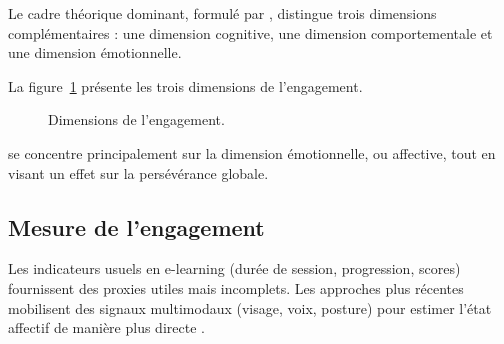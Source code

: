Le cadre théorique dominant, formulé par
\textcite{fredricks2004school}, distingue trois dimensions complémentaires :
une dimension cognitive, une dimension comportementale
et une dimension émotionnelle.


La figure~\ref{fig:fond-dimensions-engagement} présente les trois dimensions de l'engagement.

\begin{figure}[H]
\centering
{}
\caption{Dimensions de l'engagement.}
\label{fig:fond-dimensions-engagement}
\end{figure}

\emolearn{} se concentre principalement sur la dimension émotionnelle,
ou affective, tout en visant un effet sur la persévérance globale.

\subsection{Mesure de l'engagement}

Les indicateurs usuels en e-learning (durée de session, progression, scores)
fournissent des proxies utiles mais incomplets. Les approches plus
récentes mobilisent des signaux multimodaux (visage, voix, posture) pour
estimer l'état affectif de manière plus directe
\cite{dmello2015review,sharma2020multimodal,goldberg2021attentive}.

